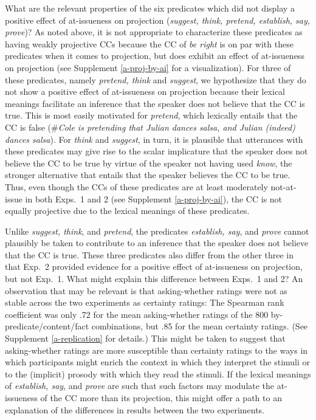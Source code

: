 \documentclass[11pt,fleqn]{article}
\newcommand{\6}{\mbox{$[\hspace*{-.6mm}[$}}
\newcommand{\9}{\mbox{$]\hspace*{-.6mm}]$}}
\begin{document}
What are the relevant properties of the six predicates which did not display a positive effect of at-issueness on projection (\emph{suggest, think, pretend, establish, say, prove})? As noted above, it is not appropriate to characterize these predicates as having weakly projective CCs because the CC of {\em be right} is on par with these predicates when it comes to projection, but does exhibit an effect of at-issueness on projection (see Supplement \ref{a-proj-by-ai} for a visualization). For three of these predicates, namely \emph{pretend, think} and \emph{suggest}, we hypothesize that they do not show a positive effect of at-issueness on projection because their lexical meanings facilitate an inference that the speaker does not believe that the CC is true. This is most easily motivated for {\em pretend}, which lexically entails that the CC is false (\#\emph{Cole is pretending that Julian dances salsa, and Julian (indeed) dances salsa}). For \emph{think} and {\em suggest}, in turn, it is plausible that utterances with these predicates may give rise to the scalar implicature that the speaker does not believe the CC to be true by virtue of the speaker not having used \emph{know}, the stronger alternative that entails that the speaker believes the CC to be true. Thus, even though the CCs of these predicates are at least moderately not-at-issue in both Exps.~1 and 2 (see Supplement \ref{a-proj-by-ai}), the CC is not equally projective due to the lexical meanings of these predicates.

Unlike \emph{suggest, think}, and \emph{pretend}, the predicates \emph{establish, say}, and \emph{prove} cannot plausibly be taken to contribute to an inference that the speaker does not believe that the CC is true. These three predicates also differ from the other three in that Exp.~2 provided evidence for a positive effect of at-issueness on projection, but not Exp.~1. What might explain this difference between Exps.~1 and 2? An observation that may be relevant is that asking-whether ratings were not as stable across the two experiments as certainty ratings: The Spearman rank coefficient was only .72 for the mean asking-whether ratings of the 800 by-predicate/content/fact combinations, but .85 for the mean certainty ratings. (See Supplement \ref{a-replication} for details.) This might be taken to suggest that asking-whether ratings are more susceptible than certainty ratings to the ways in which participants might enrich the context in which they interpret the stimuli or to the (implicit) prosody with which they read the stimuli. If the lexical meanings of \emph{establish, say}, and \emph{prove} are such that such factors may modulate the at-issueness of the CC more than its projection, this might offer a path to an explanation of the differences in results between the two experiments.  
\end{document}

